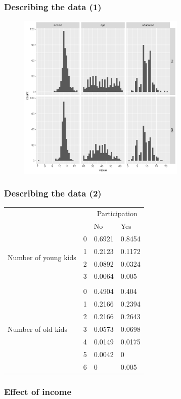 \documentclass{beamer}
\newcommand{\1}{\mathbb{1}}
\begin{document}
\begin{frame}\frametitle{Describing the data (1)}
\begin{figure}
\includegraphics[width = 8cm]{plot/char}
\end{figure}
\end{frame}

\begin{frame}\frametitle{Describing the data (2)}
\begin{table}[ht]
\centering
\begin{tabular}{llll}
  \toprule 
 &  &  \multicolumn{2}{c}{Participation} \\ 
 &  & No  & Yes \\ 
 \multirow{4}{*}{Number of young kids} & 0 & 0.6921 & 0.8454 \\ 
     & 1 & 0.2123 & 0.1172 \\ 
     & 2 & 0.0892 & 0.0324 \\ 
     & 3 & 0.0064 & 0.005 \\ \\
  \multirow{7}{*}{Number of old kids} & 0 & 0.4904 & 0.404 \\ 
     & 1 & 0.2166 & 0.2394 \\ 
     & 2 & 0.2166 & 0.2643 \\ 
     & 3 & 0.0573 & 0.0698 \\ 
     & 4 & 0.0149 & 0.0175 \\ 
     & 5 & 0.0042 & 0 \\ 
     & 6 & 0 & 0.005 \\ 
   \bottomrule 
\end{tabular}
\end{table}
\end{frame}


\begin{frame}\frametitle{Effect of income}

\end{frame}
\end{document}
